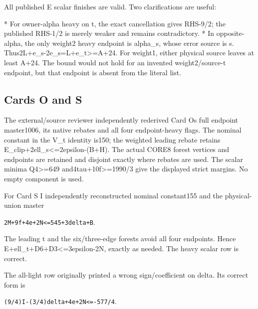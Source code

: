\documentclass[10pt,a4paper]{article}
\theoremstyle{definition}
\begin{document}
All published E scalar finishes are valid. Two clarifications are
useful:

* For owner-alpha heavy on t,\allowbreak{} the exact cancellation gives RHS-9/2; the
published RHS-1/2 is merely weaker and remains contradictory. * In
opposite-alpha,\allowbreak{} the only weight2 heavy endpoint is alpha\_\allowbreak{}s,\allowbreak{} whose error
source is s. Thus2L+\allowbreak{}e\_\allowbreak{}s-2e\_\allowbreak{}s=\allowbreak{}L+\allowbreak{}e\_\allowbreak{}t\textgreater=\allowbreak{}A+\allowbreak{}24. For weight1,\allowbreak{}
either physical source leaves at least A+\allowbreak{}24. The bound would not hold
for an invented weight2/source-t endpoint,\allowbreak{} but that endpoint is absent
from the literal list.

\hypertarget{cards-o-and-s}{%
\subsection{Cards O and S}\label{cards-o-and-s}}

The external/source reviewer independently rederived Card
O\textquotesingle s full endpoint master1006,\allowbreak{} its native rebates and all
four endpoint-heavy flags. The nominal constant in the V\_\allowbreak{}t identity
is150; the weighted leading rebate retains
E\_\allowbreak{}clip+\allowbreak{}2ell\_\allowbreak{}s\textless=\allowbreak{}2epsilon-(B+\allowbreak{}H). The actual CORE8 forest
vertices and endpoints are retained and disjoint exactly where rebates
are used. The scalar minima Q4\textgreater=\allowbreak{}649
and4tau+\allowbreak{}10f\textgreater=\allowbreak{}1990/3 give the displayed strict margins. No
empty component is used.

For Card S I independently reconstructed nominal constant155 and the
physical-union master

\texttt{2M+\allowbreak{}9f+\allowbreak{}4e+\allowbreak{}2N<=\allowbreak{}545+\allowbreak{}3delta+\allowbreak{}B}.

The leading t and the six/three-edge forests avoid all four endpoints.
Hence E+\allowbreak{}ell\_\allowbreak{}t+\allowbreak{}D6+\allowbreak{}D3\textless=\allowbreak{}3epsilon-2N,\allowbreak{} exactly as needed. The heavy
scalar row is correct.

The all-light row originally printed a wrong sign/coefficient on delta.
Its correct form is

\texttt{(9/\allowbreak{}4)I-(3/\allowbreak{}4)delta+\allowbreak{}4e+\allowbreak{}2N<=\allowbreak{}-577/\allowbreak{}4}.
\end{document}
